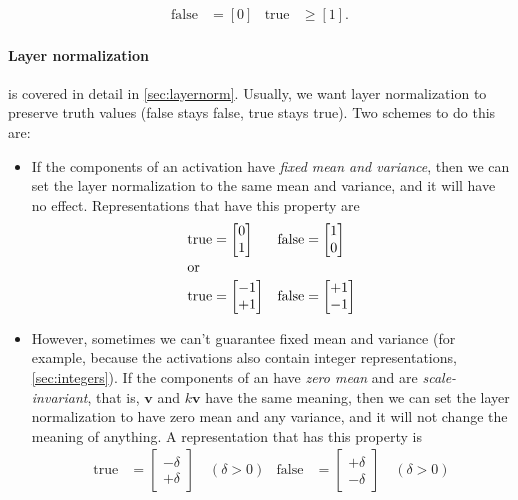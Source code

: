 \begin{align*}
  \text{false} &= [0] &\text{true} &\ge [1].
\end{align*}

\paragraph{Layer normalization} is covered in detail in \cref{sec:layernorm}. Usually, we want layer normalization to preserve truth values (false stays false, true stays true). Two schemes to do this are:
\begin{itemize}
\item If the components of an activation have \emph{fixed mean and variance}, then we can set the layer normalization to the same mean and variance, and it will have no effect. Representations that have this property are
  \begin{align*}
    \text{true} &=
    \begin{bmatrix}
      0 \\ 1
    \end{bmatrix}
    &
    \text{false} &=
    \begin{bmatrix}
      1 \\ 0
    \end{bmatrix} \\
    \intertext{or}
    \text{true} &=
    \begin{bmatrix}
      -1 \\ +1
    \end{bmatrix}
    &
    \text{false} &=
    \begin{bmatrix}
      +1 \\ -1
    \end{bmatrix} \\
  \end{align*}
\item However, sometimes we can't guarantee fixed mean and variance (for example, because the activations also contain integer representations, \cref{sec:integers}). If the components of an have \emph{zero mean} and are \emph{scale-invariant}, that is, $\mathbf{v}$ and $k\mathbf{v}$ have the same meaning, then we can set the layer normalization to have zero mean and any variance, and it will not change the meaning of anything. A representation that has this property is
  \begin{align*}
    \text{true} &=
    \begin{bmatrix}
      -\delta \\ +\delta
    \end{bmatrix}
    \quad (\delta>0)
    &
    \text{false} &=
    \begin{bmatrix}
      +\delta \\ -\delta
    \end{bmatrix}
    \quad (\delta>0)
  \end{align*}
\end{itemize}

